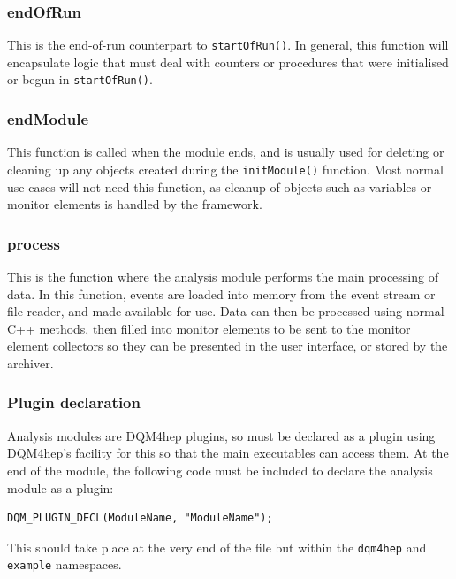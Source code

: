 
\subsubsection{endOfRun}
This is the end-of-run counterpart to \texttt{startOfRun()}. In general, this function will encapsulate logic that must deal with counters or procedures that were initialised or begun in \texttt{startOfRun()}.

\subsubsection{endModule}
This function is called when the module ends, and is usually used for deleting or cleaning up any objects created during the \texttt{initModule()} function. Most normal use cases will not need this function, as cleanup of objects such as variables or monitor elements is handled by the framework.

\subsubsection{process}
This is the function where the analysis module performs the main processing of data. In this function, events are loaded into memory from the event stream or file reader, and made available for use. Data can then be processed using normal C++ methods, then filled into monitor elements to be sent to the monitor element collectors so they can be presented in the user interface, or stored by the archiver.

\subsubsection{Plugin declaration}
Analysis modules are \acrshort{DQM4hep} plugins, so must be declared as a plugin using \acrshort{DQM4hep}'s facility for this so that the main executables can access them. At the end of the module, the following code must be included to declare the analysis module as a plugin:

\begin{lstlisting}
DQM_PLUGIN_DECL(ModuleName, "ModuleName");
\end{lstlisting}

This should take place at the very end of the file but within the \texttt{dqm4hep} and \texttt{example} namespaces.

